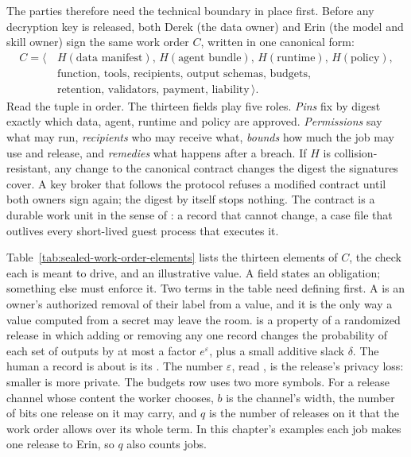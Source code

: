 \documentclass[11pt,a4paper]{article}
\theoremstyle{definition}
\begin{document}
The parties therefore need the technical boundary in place first. Before any
decryption key is released, both Derek (the data
owner) and Erin (the model and skill owner) sign the same work order $C$,
written in one canonical form:
{\small\[
\begin{aligned}
C=\bigl\langle\, & H(\text{data manifest}),\,H(\text{agent bundle}),\,H(\text{runtime}),\,H(\text{policy}),\\
& \text{function},\,\text{tools},\,\text{recipients},\,\text{output schemas},\,\text{budgets},\\
& \text{retention},\,\text{validators},\,\text{payment},\,\text{liability}\,\bigr\rangle.
\end{aligned}
\]}
Read the tuple in order. The thirteen fields play five roles. \emph{Pins} fix
by digest exactly which data, agent, runtime and policy are approved.
\emph{Permissions} say what may run, \emph{recipients} who may receive what,
\emph{bounds} how much the job may use and release, and \emph{remedies} what
happens after a breach. If $H$ is collision-resistant, any change to the
canonical contract changes the digest the signatures cover. A key broker that
follows the protocol refuses a modified contract until both owners sign again;
the digest by itself stops nothing.
The contract is a durable work unit in the sense of : a record that cannot change, a case file that outlives
every short-lived guest process that executes it.

Table~\ref{tab:sealed-work-order-elements} lists the thirteen elements of $C$,
the check each is meant to drive, and an illustrative value. A field states an
obligation; something else must enforce it. Two terms in the table need
defining first. A  is an owner's authorized removal
of their label from a value, and it is the only way a value computed from a
secret may leave the room. 
is a property of a randomized release in which adding or removing any one
record changes the probability of each set of outputs by at most a factor
$e^{\varepsilon}$, plus a small additive slack $\delta$. The human a record is
about is its . The number $\varepsilon$, read
, is the release's privacy loss: smaller is more private.
The budgets row uses two more symbols. For a release channel whose content
the worker chooses, $b$ is the channel's width, the number of bits one
release on it may carry, and $q$ is the number of releases on it that the
work order allows over its whole term. In this chapter's examples each job
makes one release to Erin, so $q$ also counts jobs.
\end{document}
